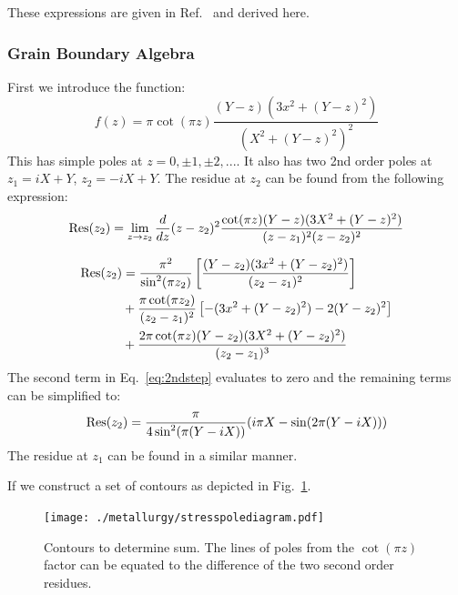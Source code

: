 These expressions are given in Ref.~\cite{sutton95} and derived here.

\subsubsection{Grain Boundary Algebra}
\label{gbalgebra}
First we introduce the function:
%
\begin{equation}
f(z) =  \pi\cot(\pi z)\frac{(Y-z)(3x^{2} + (Y-z)^{2})}{(X^{2} + (Y-z)^{2})^{2}}
\end{equation}
%
This has simple poles at $z = 0, \pm 1, \pm 2,...$. It also has two 2nd 
order poles at  $z_{1}=iX+Y$, $z_{2}=-iX+Y$. The residue at $z_{2}$ can
be found from the following expression: 
%
\begin{equation}
{\rm Res}(z_{2}) = \lim_{z\rightarrow z_{2}}\frac{d}{dz}(z-z_{2})^{2}
\frac{\cot(\pi z)(Y-z)(3X^{2}+(Y-z)^2)}{(z-z_{1})^{2}(z-z_{2})^{2}}
\end{equation}


\begin{align}
\label{eq:2ndstep}
{\rm Res}(z_{2})&=\frac{\pi^{2}}{\sin^{2}(\pi z_{2})}\left[\frac{(Y-z_{2})(3x^{2}+(Y-z_{2})^{2})}{(z_{2}-z_{1})^{2}}\right]\\
  &+\frac{\pi\cot(\pi z_{2})}{(z_{2}-z_{1})^{2}}\left[-(3x^{2} + (Y-z_{2})^{2})-2(Y-z_{2})^{2}\right] \\
  &+\frac{2\pi\cot(\pi z)(Y-z_{2})(3X^{2}+(Y-z_{2})^{2})}{(z_{2} - z_{1})^{3}}
\end{align}
%
The second term in Eq.~\ref{eq:2ndstep} evaluates to zero and the remaining terms can be simplified to:
%
\begin{equation}
{\rm Res}(z_{2}) = \frac{\pi}{4\sin^{2}(\pi(Y-iX))}(i\pi X - \sin(2\pi(Y-iX)))
\end{equation}
%
The residue at $z_{1}$ can be found in a similar manner.

If we construct a set of contours as depicted in Fig.~\ref{fig:polediagram}.
\begin{figure}[!tbp]
\begin{center}
\texttt{[image: ./metallurgy/stresspolediagram.pdf]}
\caption{Contours to determine sum. The lines of poles from the $\cot(\pi z)$ 
factor can be equated to the difference of the two 
second order residues.\label{fig:polediagram}}
\end{center}
\end{figure}


